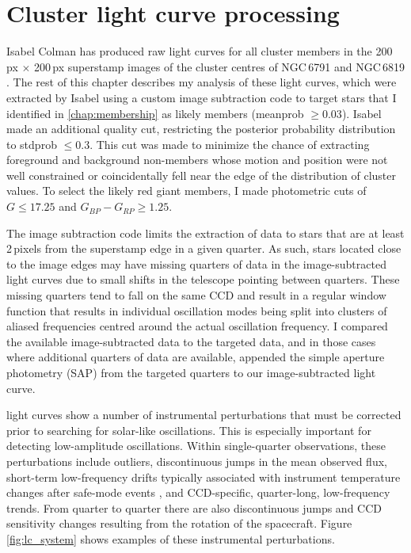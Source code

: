 %




\section{Cluster light curve processing}
\label{sect:lc_select}



Isabel Colman has produced raw light curves for all cluster members in the 200\,px $\times$ 200\,px \Kepler{} superstamp images of the cluster centres of NGC\,6791 and NGC\,6819 \citep{colman_pixels_2020}. The rest of this chapter describes my analysis of these light curves, which were extracted by Isabel using a custom image subtraction code to target stars that I identified in \cref{chap:membership} as likely members (meanprob $\ge 0.03$). Isabel made an additional quality cut, restricting the posterior probability distribution to stdprob $\leq 0.3$. This cut was made to minimize the chance of extracting foreground and background non-members whose motion and position were not well constrained or coincidentally fell near the edge of the distribution of cluster values. To select the likely red giant members, I made photometric cuts of $G \leq 17.25$ and $G_{BP}-G_{RP}\ge1.25$.

The image subtraction code limits the extraction of data to stars that are at least 2\,pixels from the superstamp edge in a given quarter. As such, stars located close to the image edges may have missing quarters of data in the image-subtracted light curves due to small shifts in the telescope pointing between quarters. These missing quarters tend to fall on the same CCD and result in a regular window function that results in individual oscillation modes being split into clusters of aliased frequencies centred around the actual oscillation frequency. I compared the available image-subtracted data to the \Kepler{} targeted data, and in those cases where additional quarters of data are available, appended the simple aperture photometry (SAP) from the targeted quarters to our image-subtracted light curve.

\Kepler{} light curves show a number of instrumental perturbations that must be corrected prior to searching for solar-like oscillations. This is especially important for detecting low-amplitude oscillations. Within single-quarter observations, these perturbations include outliers, discontinuous jumps in the mean observed flux, short-term low-frequency drifts typically associated with instrument temperature changes after safe-mode events \citep{garcia_preparation_2011}, and CCD-specific, quarter-long, low-frequency trends. From quarter to quarter there are also discontinuous jumps and CCD sensitivity changes resulting from the rotation of the \Kepler{} spacecraft. Figure \ref{fig:lc_system} shows examples of these instrumental perturbations. 

